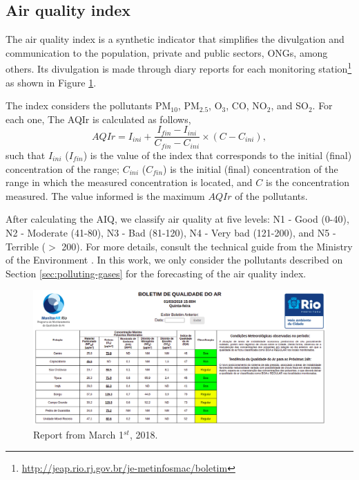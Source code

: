 \subsection{Air quality index}
\label{sec:aiq}

The air quality index is a synthetic indicator that simplifies the divulgation
and communication to the population, private and public sectors, ONGs, among others.
Its divulgation is made through diary reports for each monitoring
station\footnote{\url{http://jeap.rio.rj.gov.br/je-metinfosmac/boletim}} as
shown in Figure \ref{fig:boletim}. 

The index considers the pollutants PM$_{10}$, PM$_{2.5}$, O$_3$,
CO, NO$_2$, and SO$_2$. For each one, The AQIr is calculated as follows,
\begin{equation}
    \label{eq:AQI}
    AQIr = I_{ini} + \frac{I_{fin} - I_{ini}}{C_{fin} - C_{ini}} \times (C - C_{ini}), 
\end{equation}
such that $I_{ini}$ ($I_{fin}$) is the value of the index that corresponds to
the initial (final) concentration of the range; $C_{ini}$ ($C_{fin}$) is the
initial (final) concentration of the range in which the measured concentration
is located, and $C$ is the concentration measured. The value informed is the
maximum $AQIr$ of the pollutants. 

After calculating the AIQ, we classify air quality at five levels: N1 - Good (0-40),
N2 - Moderate (41-80), N3 - Bad (81-120), N4 - Very bad (121-200), and N5 - Terrible ($>$ 200). For more details,
consult the technical guide from the Ministry of the Environment
\cite{guia-tecnico-mma}. In this work, we only consider the pollutants
described on Section \ref{sec:polluting-gases} for the forecasting of the air
quality index. 

\begin{figure}[!ht]  
    \includegraphics[width=\linewidth]{../images/boletim01-03-2018.png}
    \caption{Report from March 1$^{st}$, 2018.}
    \label{fig:boletim}
\end{figure}




